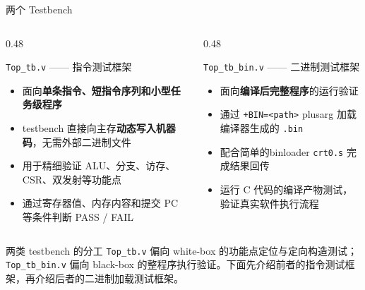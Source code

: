 \documentclass[aspectratio=169,xcolor={dvipsnames,svgnames},10pt]{beamer}
\newcommand{\hl}[1]{\textcolor{AccentOrange}{\textbf{#1}}}
\newcommand{\code}[1]{\texttt{\small\color{PrimaryBlue}#1}}
\begin{document}
\begin{frame}{两个 Testbench}
  \small
  \begin{columns}[T]
    \begin{column}{0.48\textwidth}
      \begin{block}{\texttt{Top\_tb.v} —— 指令测试框架}
        \small
        \begin{itemize}
          \item 面向\hl{单条指令、短指令序列和小型任务级程序}
          \item testbench 直接向主存\hl{动态写入机器码}，无需外部二进制文件
          \item 用于精细验证 ALU、分支、访存、CSR、双发射等功能点
          \item 通过寄存器值、内存内容和提交 PC 等条件判断 PASS / FAIL
        \end{itemize}
      \end{block}
    \end{column}
    \begin{column}{0.48\textwidth}
      \begin{block}{\texttt{Top\_tb\_bin.v} —— 二进制测试框架}
        \small
        \begin{itemize}
          \item 面向\hl{编译后完整程序}的运行验证
          \item 通过 \code{+BIN=<path>} plusarg 加载 编译器生成的 \code{.bin}
          \item 配合简单的binloader \code{crt0.s} 完成结果回传
          \item 运行 C 代码的编译产物测试，验证真实软件执行流程
        \end{itemize}
      \end{block}
    \end{column}
  \end{columns}
  \vspace{0.15cm}
  \begin{exampleblock}{两类 testbench 的分工}
    \small
    \texttt{Top\_tb.v} 偏向 white-box 的功能点定位与定向构造测试；
    \texttt{Top\_tb\_bin.v} 偏向 black-box 的整程序执行验证。下面先介绍前者的指令测试框架，再介绍后者的二进制加载测试框架。
  \end{exampleblock}
\end{frame}
\end{document}
